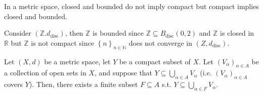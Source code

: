 \begin{remark}
    In a metric space, closed and bounded do not imply compact but compact implies closed and bounded.
\end{remark}

\begin{eg}
    Consider \(\left( \mathbb{Z} . d_{\text{disc}} \right) \), then \(\mathbb{Z} \) is bounded since \(\mathbb{Z} \subseteq B_{\text{disc}}(0, 2)\) and \(\mathbb{Z} \) is closed in \(\mathbb{R} \)  but \(\mathbb{Z} \) is not compact since \(\left\{ n \right\}_{n \in \mathbb{N} } \) does not converge in \(\left( Z, d_{\text{disc}} \right) \). 
\end{eg}

\begin{theorem} \label{thm: compact to subcover}
    Let \((X, d)\) be a metric space, let \(Y\) be a compact subset of \(X\). Let \(\left( V_\alpha  \right)_{\alpha \in A} \) be a collection of open sets in \(X\), and suppose that \(Y \subseteq \bigcup_{\alpha \in A} V_\alpha  \) (i.e. \(\left( V_\alpha  \right)_{\alpha \in A} \) covers \(Y\)). Then, there exists a finite subset \(F \subseteq A\) s.t. \(Y \subseteq \bigcup_{\alpha \in F} V_\alpha  \).        
\end{theorem}
